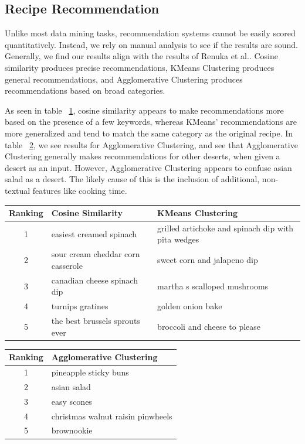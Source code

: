 \documentclass[sigconf]{acmart}
\begin{document}
\subsection{Recipe Recommendation}
Unlike most data mining tasks, recommendation systems cannot be easily scored quantitatively. Instead, we rely on manual analysis to see if the results are sound. Generally, we find our results align with the results of Renuka et al.. Cosine similarity produces precise recommendations, KMeans Clustering produces general recommendations, and Agglomerative Clustering produces recommendations based on broad categories.

As seen in table ~\ref{tab:cos_sim_kmeans}, cosine similarity appears to make recommendations more based on the presence of a few keywords, whereas KMeans' recommendations are more generalized and tend to match the same category as the original recipe. In table ~\ref{tab:agglom_cluster}, we see results for Agglomerative Clustering, and see that Agglomerative Clustering generally makes recommendations for other deserts, when given a desert as an input. However, Agglomerative Clustering appears to confuse asian salad as a desert. The likely cause of this is the inclusion of additional, non-textual features like cooking time. 
\begin{table}[h]
\begin{tabular}{|c|p{3cm}|p{3cm}|}
     \hline Ranking & Cosine Similarity & KMeans Clustering  \\
     \hline 1 & easiest creamed spinach & grilled artichoke and spinach dip with pita wedges \\
     \hline 2 & sour cream cheddar corn casserole & sweet corn and jalapeno dip \\
     \hline 3 & canadian cheese spinach dip & martha s scalloped mushrooms \\
     \hline 4 & turnips gratines & golden onion bake \\
     \hline 5 & the best brussels sprouts ever & broccoli and cheese to please \\
     \hline 
\end{tabular}
\label{tab:cos_sim_kmeans}
\end{table}

\begin{table}[h]
\begin{tabular}{|c|p{6cm}|}
     \hline Ranking & Agglomerative Clustering  \\
     \hline 1 & pineapple sticky buns \\
     \hline 2 & asian salad \\
     \hline 3 & easy scones \\
     \hline 4 & christmas walnut raisin pinwheels \\
     \hline 5 & brownookie \\
     \hline
\end{tabular}
\label{tab:agglom_cluster}
\end{table}
\end{document}
